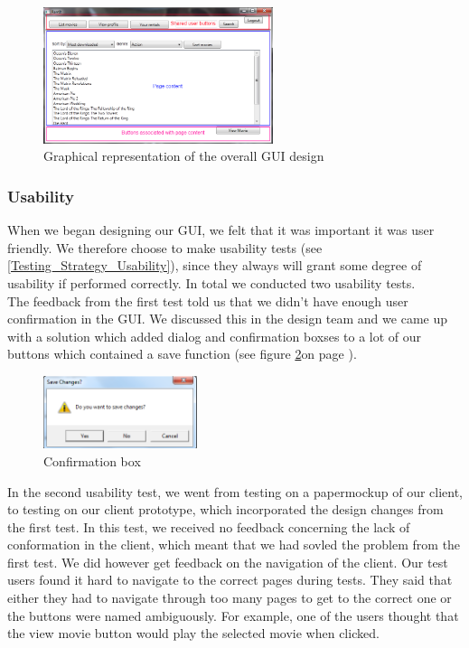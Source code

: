 \begin{figure}[h!]
  \centering
\includegraphics[width=0.60\textwidth]{Parts/Images/Design/GUIDesign}
\caption{Graphical representation of the overall GUI design}
\label{fig:Design_Client_GUI_Usability_design}
\end{figure}


\subsubsection{Usability}
\label{Design_Client_GUI_Usability}
When we began designing our GUI, we felt that it was important it was user friendly. We therefore choose to make usability tests (see \ref{Testing_Strategy_Usability}), since they always will grant some degree of usability if performed correctly. In total we conducted two usability tests.
\\The feedback from the first test told us that we didn't have enough user confirmation in the GUI. We discussed this in the design team and we came up with a solution which added dialog and confirmation boxses to a lot of our buttons which contained a save function (see figure \ref{fig:Design_Client_GUI_Usability_popup}on page \pageref{fig:Design_Client_GUI_Usability_popup}).

\begin{figure}[h!]
  \centering
\includegraphics[width=0.4\textwidth]{Parts/Images/Design/Confirmationbox}
\caption{Confirmation box}
\label{fig:Design_Client_GUI_Usability_popup}
\end{figure}

In the second usability test, we went from testing on a papermockup of our client, to testing on our client prototype, which incorporated the design changes from the first test. In this test, we received no feedback concerning the lack of conformation in the client, which meant that we had sovled the problem from the first test. We did however get feedback on the navigation of the client. Our test users found it hard to navigate to the correct pages during tests. They said that either they had to navigate through too many pages to get to the correct one or the buttons were named ambiguously. For example, one of the users thought that the view movie button would play the selected movie when clicked.

